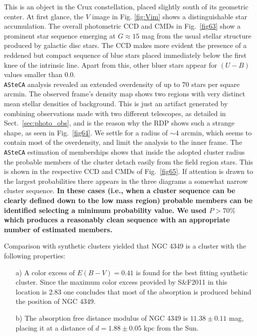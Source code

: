 \documentclass[draft]{aa}
\begin{document}
This is an object in the Crux constellation, placed slightly south of its
geometric center. At first glance, the $V$ image in Fig. \ref{fig:Vim} shows a
distinguishable star accumulation. The overall photometric CCD and CMDs in
Fig.~\ref{fig63} show a prominent star sequence emerging at $G\approx15$ mag
from the usual stellar structure produced by galactic disc stars.
The CCD makes more evident the presence of a reddened but compact sequence of
blue stars placed immediately below the first knee of the intrinsic line. Apart
from this, other bluer stars appear for $(U-B)$ values smaller than 0.0.\\ 

\texttt{ASteCA} analysis revealed an extended overdensity of up to 70 stars per
square arcmin. The observed frame's density map shows two regions with
very distinct mean stellar densities of background. This is just an artifact
generated by combining observations made with two different telescopes, as
detailed in Sect.~\ref{sec:photo_obs}, and is the reason why
the RDP shows such a strange shape, as seen in Fig.~\ref{fig64}. We
settle for a radius of $\sim4$ arcmin, which seems to contain most of the
overdensity, and limit the analysis to the inner frame.
%
The \texttt{ASteCA} estimation of memberships shows that inside the adopted
cluster radius the probable members of the cluster detach easily from the field
region stars. This is shown in the respective CCD and CMDs of Fig.~\ref{fig65}.
If attention is drawn to the largest probabilities there appears in the three
diagrams a somewhat narrow cluster sequence.
\textbf{In these cases (i.e., when a cluster sequence can be clearly defined
down to the low mass region) probable members can be identified selecting a
minimum probability value. We used $P>70\%$ which produces a reasonably clean
sequence with an appropriate number of estimated members.}
%
%

Comparison with synthetic clusters yielded that NGC 4349 is a cluster with the
following properties:

\begin{itemize}
\item [a)] A color excess of $E(B-V)=0.41$ is found for the best
fitting synthetic cluster. Since the maximum color excess provided by
S\&F2011 in this location is 2.83 one concludes that most of the
absorption is produced behind the position of NGC 4349.
\item [b)] The absorption free distance modulus of NGC 4349 is
$11.38\pm0.11$ mag, placing it at a distance of $d=1.88\pm0.05$ kpc from
the Sun.
\end{itemize}
\end{document}
